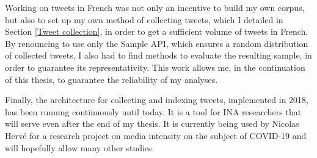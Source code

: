 Working on tweets in French was not only an incentive to build my own corpus, but also to set up my own method of collecting tweets, which I detailed in Section \ref{Tweet collection}, in order to get a sufficient volume of tweets in French. By renouncing to use only the Sample API, which ensures a random distribution of collected tweets, I also had to find methods to evaluate the resulting sample, in order to guarantee its representativity. This work allows me, in the continuation of this thesis, to guarantee the reliability of my analyses.


Finally, the architecture for collecting and indexing tweets, implemented in 2018, has been running continuously until today. It is a tool for INA researchers that will serve even after the end of my thesis. It is currently being used by Nicolas Hervé for a research project on media intensity on the subject of COVID-19  and will hopefully allow many other studies.